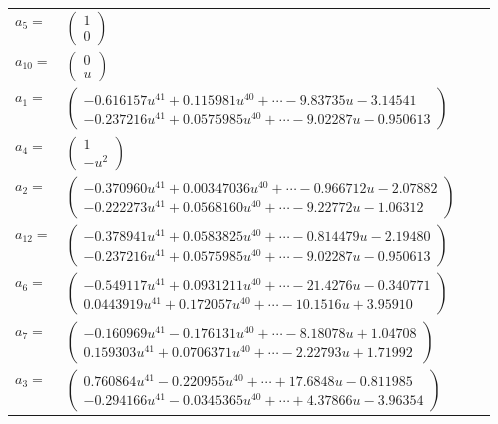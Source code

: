 \documentclass[1p]{elsarticle_modified}
\theoremstyle{definition}
\begin{document}
\begin{tabular}{m{7pt} m{180pt} m{7pt} m{180pt} }
\flushright $a_{5}=$&$\begin{pmatrix}1\\0\end{pmatrix}$ \\
\flushright $a_{10}=$&$\begin{pmatrix}0\\u\end{pmatrix}$ \\
\flushright $a_{1}=$&$\begin{pmatrix}-0.616157 u^{41}+0.115981 u^{40}+\cdots-9.83735 u-3.14541\\-0.237216 u^{41}+0.0575985 u^{40}+\cdots-9.02287 u-0.950613\end{pmatrix}$ \\
\flushright $a_{4}=$&$\begin{pmatrix}1\\- u^2\end{pmatrix}$ \\
\flushright $a_{2}=$&$\begin{pmatrix}-0.370960 u^{41}+0.00347036 u^{40}+\cdots-0.966712 u-2.07882\\-0.222273 u^{41}+0.0568160 u^{40}+\cdots-9.22772 u-1.06312\end{pmatrix}$ \\
\flushright $a_{12}=$&$\begin{pmatrix}-0.378941 u^{41}+0.0583825 u^{40}+\cdots-0.814479 u-2.19480\\-0.237216 u^{41}+0.0575985 u^{40}+\cdots-9.02287 u-0.950613\end{pmatrix}$ \\
\flushright $a_{6}=$&$\begin{pmatrix}-0.549117 u^{41}+0.0931211 u^{40}+\cdots-21.4276 u-0.340771\\0.0443919 u^{41}+0.172057 u^{40}+\cdots-10.1516 u+3.95910\end{pmatrix}$ \\
\flushright $a_{7}=$&$\begin{pmatrix}-0.160969 u^{41}-0.176131 u^{40}+\cdots-8.18078 u+1.04708\\0.159303 u^{41}+0.0706371 u^{40}+\cdots-2.22793 u+1.71992\end{pmatrix}$ \\
\flushright $a_{3}=$&$\begin{pmatrix}0.760864 u^{41}-0.220955 u^{40}+\cdots+17.6848 u-0.811985\\-0.294166 u^{41}-0.0345365 u^{40}+\cdots+4.37866 u-3.96354\end{pmatrix}$ \\

\end{tabular}
\end{document}
